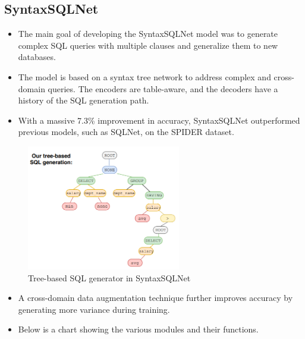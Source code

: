\subsection{SyntaxSQLNet}

\begin{itemize}
    \item The main goal of developing the SyntaxSQLNet model was to generate complex SQL queries with multiple clauses and generalize them to new databases.
    \item The model is based on a syntax tree network to address complex and cross-domain queries. The encoders are table-aware, and the decoders have a history of the SQL generation path.
    \item With a massive 7.3\% improvement in accuracy, SyntaxSQLNet outperformed previous models, such as SQLNet, on the SPIDER dataset.
\end{itemize}


\begin{figure}[htb]
    \centering
    \includegraphics[width=0.6\textwidth]{pics/SyntaxSQLNet/Tree-based.png}
    \caption{Tree-based SQL generator in SyntaxSQLNet}
    \label{fig:tree-based}
\end{figure}

\begin{itemize}
    \item A cross-domain data augmentation technique further improves accuracy by generating more variance during training.
    \item Below is a chart showing the various modules and their functions.
\end{itemize}

